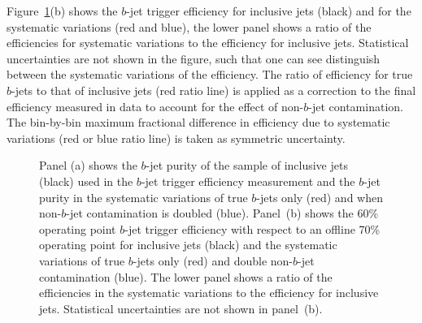 Figure~\ref{fig:Eff_Purity}(b) shows the $b$-jet trigger efficiency for inclusive jets (black) and
for the systematic variations (red and blue),
the lower panel shows a ratio of the efficiencies for systematic variations to the efficiency for inclusive jets.
Statistical uncertainties are not shown in the figure, such that one can see distinguish between the systematic variations of the efficiency.
The ratio of efficiency for true $b$-jets to that of inclusive jets (red ratio line) is applied as a correction to the final efficiency measured in data
to account for the effect of non-$b$-jet contamination.
The bin-by-bin maximum fractional difference in efficiency due to systematic variations (red or blue ratio line) is taken as symmetric uncertainty.


\begin{figure}[!htb]
  \begin{center}
    \captionsetup[subfigure]{aboveskip=0pt,justification=centering}
  \end{center}
\vspace{-1em}
  \caption[The $b$-jet purity and $b$-jet trigger efficiency when the size of the non-$b$-jet contamination is systematically varied.]
          {\label{fig:Eff_Purity} Panel (a) shows the $b$-jet purity of the sample of inclusive jets (black) used in the $b$-jet trigger efficiency measurement
    and the $b$-jet purity in the systematic variations of true $b$-jets only (red) and when non-$b$-jet contamination is doubled (blue).
    Panel~(b) shows the 60\% operating point $b$-jet trigger efficiency with respect to an offline 70\% operating point for inclusive jets (black)
    and the systematic variations of true $b$-jets only (red) and double non-$b$-jet contamination (blue).
    The lower panel shows a ratio of the efficiencies in the systematic variations to the efficiency for inclusive jets.
    Statistical uncertainties are not shown in panel~(b).}
\end{figure}

